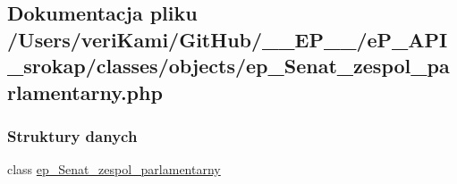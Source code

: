 \hypertarget{ep___senat__zespol__parlamentarny_8php}{\subsection{Dokumentacja pliku /\-Users/veri\-Kami/\-Git\-Hub/\-\_\-\-\_\-\-E\-P\-\_\-\-\_\-/e\-P\-\_\-\-A\-P\-I\-\_\-srokap/classes/objects/ep\-\_\-\-Senat\-\_\-zespol\-\_\-parlamentarny.php}
\label{ep___senat__zespol__parlamentarny_8php}
}
\subsubsection*{Struktury danych}
\begin{DoxyCompactItemize}
\item 
class \hyperlink{classep___senat__zespol__parlamentarny}{ep\-\_\-\-Senat\-\_\-zespol\-\_\-parlamentarny}
\end{DoxyCompactItemize}
